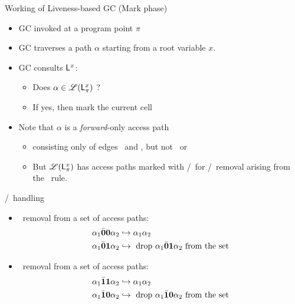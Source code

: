 \documentclass[xcolor=x11names,compress,mathserif]{beamer}
\renewcommand{\(}{\begin{columns}}
\renewcommand{\)}{\end{columns}}
\newcommand{\<}[1]{\begin{column}{#1}}
\renewcommand{\>}{\end{column}}
\begin{document}
\begin{frame}{Working of Liveness-based GC (Mark phase)}
  \begin{itemize}
  \item GC invoked at a program point $\pi$
  \item GC traverses a path $\alpha$ starting from a root variable $x$.
  \item GC consults $\mathsf{L}_{{}}^{x}$: 
    \begin{itemize}
    \item Does $\alpha \in \mathscr{L}(\mathsf{L}_{{\pi}}^{x})$ ?
    \item If yes, then mark the current cell
    \end{itemize}
  \item  Note  that  $\alpha$  is a  {\em  forward}-only  access  path
    \begin{itemize}
    \item consisting  only of  edges \acar\  and \acdr,  but not  \bcar\ or
      \bcdr
    \item But $\mathscr{L}(\mathsf{L}_{{\pi}}^{x})$ has access paths marked with \bcar/\bcdr\ for \acar/\acdr\  removal
  arising from the \CONS\  rule.
    \end{itemize}
  \end{itemize}
\end{frame}
\begin{frame}{\bcar/\bcdr\ handling}

\begin{itemize}
\item \acar\   removal from a set of access paths:
\begin{align*}
\alpha_1\bar{\mathbf{0}}\mathbf{0}\alpha_2 &\hookrightarrow
  \alpha_1\alpha_2\\
\alpha_1\bar{\mathbf{0}} \mathbf{1}\alpha_2 &\hookrightarrow
  \mbox{ drop $\alpha_1\bar{\mathbf{0}} \mathbf{1} \alpha_2$ from the set}
\end{align*}
\item \acdr\   removal from a set of access paths:
\begin{align*}
\alpha_1\bar{\mathbf{1}}\mathbf{1}\alpha_2 &\hookrightarrow
  \alpha_1\alpha_2\\
\alpha_1\bar{\mathbf{1}} \mathbf{0}\alpha_2 &\hookrightarrow
  \mbox{ drop $\alpha_1\bar{\mathbf{1}} \mathbf{0} \alpha_2$ from the set}
\end{align*}
\end{itemize}

\end{frame}
\end{document}

